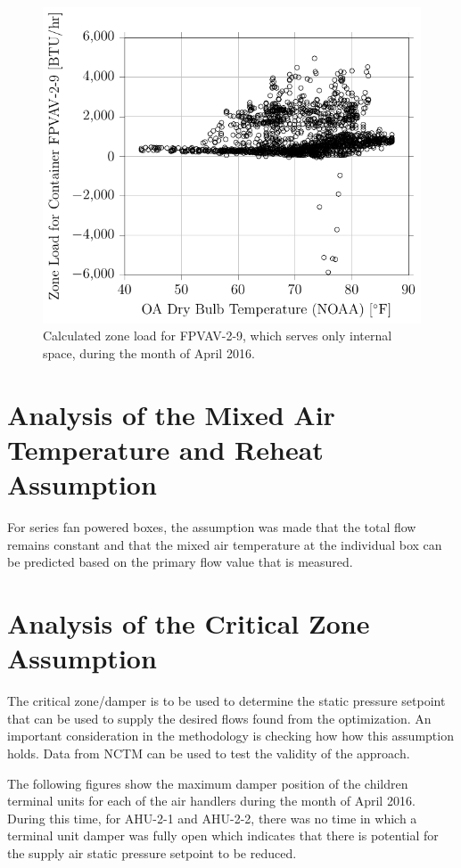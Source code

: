 \begin{figure}
\centering
\includegraphics{Plots/CalculatedZoneLoad-2-9.pdf} 
\caption{Calculated zone load for FPVAV-2-9, which serves only internal space, during the month of April 2016.}
\label{fig:ZoneLoadForContainer29vsNOAAOAT}
\end{figure}


\section{Analysis of the Mixed Air Temperature and Reheat Assumption}

For series fan powered boxes, the assumption was made that the total flow remains constant and that the mixed air temperature at the individual box can be predicted based on the primary flow value that is measured. 


\section{Analysis of the Critical Zone Assumption}

The critical zone/damper is to be used to determine the static pressure setpoint that can be used to supply the desired flows found from the optimization. An important consideration in the methodology is checking how how this assumption holds. Data from NCTM can be used to test the validity of the approach.


The following figures show the maximum damper position of the children terminal units for each of the air handlers during the month of April 2016. During this time, for AHU-2-1 and AHU-2-2, there was no time in which a terminal unit damper was fully open which indicates that there is potential for the supply air static pressure setpoint to be reduced.  

